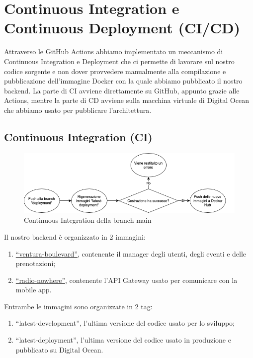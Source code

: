\section{Continuous Integration e Continuous Deployment (CI/CD)}
\label{sect:CICD_it3}
Attraverso le GitHub Actions abbiamo implementato un meccanismo di Continuous Integration e Deployment che ci permette di lavorare sul nostro codice sorgente e non dover provvedere manualmente alla compilazione e pubblicazione dell'immagine Docker con la quale abbiamo pubblicato il nostro backend. La parte di CI avviene direttamente su GitHub, appunto grazie alle Actions, mentre la parte di CD avviene sulla macchina virtuale di Digital Ocean che abbiamo usato per pubblicare l'architettura.
\subsection{Continuous Integration (CI)}
\begin{figure}[h!]
  \centering
  \includegraphics[width=1\textwidth]{Iterazione 3/images/CI.png}
  \caption{Continuous Integration della branch main}
\end{figure}
Il nostro backend è organizzato in 2 immagini:
\begin{enumerate}
  \item \href{https://hub.docker.com/repository/docker/freddy153/ventura-boulevard/}{``ventura-boulevard''}, contenente il manager degli utenti, degli eventi e delle prenotazioni;
  \item \href{https://hub.docker.com/repository/docker/freddy153/radio-nowhere/}{``radio-nowhere''}, contenente l'API Gateway usato per comunicare con la mobile app.
\end{enumerate}
Entrambe le immagini sono organizzate in 2 tag:
\begin{enumerate}
  \item ``latest-development'', l'ultima versione del codice usato per lo sviluppo;
  \item ``latest-deployment'', l'ultima versione del codice usato in produzione e pubblicato su Digital Ocean.
\end{enumerate}
